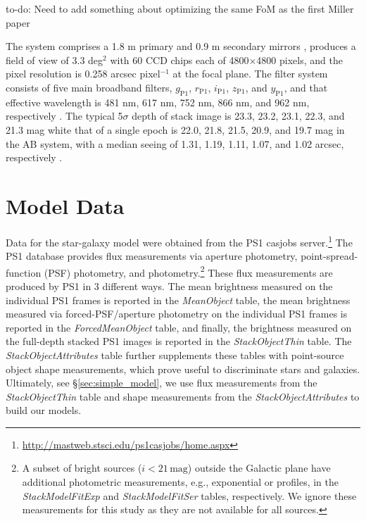 \documentclass[twocolumn, dvipdfmx]{aastex62}
\newcommand{\todo}[1]{{\color{magenta} to-do: {#1}}}
\begin{document}
\todo{Need to add something about optimizing the same FoM as the first Miller paper}

The system comprises a 1.8 m primary and 0.9 m secondary mirrors \citep{Hodapp04}, 
produces a field of view of 3.3 deg$^2$ with 60 CCD chips each of 4800$\times$4800 pixels, 
and the pixel resolution is 0.258 arcsec pixel$^{-1}$ at the focal plane. 
The filter system consists of five main broadband filters, 
$g_{\mathrm{P1}}$, $r_{\mathrm{P1}}$, $i_{\mathrm{P1}}$, $z_{\mathrm{P1}}$, and $y_{\mathrm{P1}}$, 
and that effective wavelength is 481 nm, 617 nm, 752 nm, 866 nm, and 962 nm, 
respectively \citep{Tonry12, Schlafly12}. 
The typical 5$\sigma$ depth of stack image is 23.3, 23.2, 23.1, 22.3, and 21.3 mag 
white that of a single epoch is 22.0, 21.8, 21.5, 20.9, and 19.7 mag in the AB system, 
with a median seeing of 1.31, 1.19, 1.11, 1.07, and 1.02 arcsec, respectively \citep{Chambers16}. 
\fi


\section{Model Data}\label{sec:model_data}

Data for the star-galaxy model were obtained from the PS1 casjobs
server.\footnote{\url{http://mastweb.stsci.edu/ps1casjobs/home.aspx}} The PS1
database provides flux measurements via aperture photometry,
point-spread-function (PSF) photometry, and \citet{Kron80}
photometry.\footnote{A subset of bright sources ($i < 21\,\mathrm{mag}$)
outside the Galactic plane have additional photometric measurements, e.g.,
exponential or \citet{Sersic63} profiles, in the \textit{StackModelFitExp} and
\textit{StackModelFitSer} tables, respectively. We ignore these measurements
for this study as they are not available for all sources.} These flux
measurements are produced by PS1 in 3 different ways. The mean brightness
measured on the individual PS1 frames is reported in the \textit{MeanObject}
table, the mean brightness measured via forced-PSF/aperture photometry on the
individual PS1 frames is reported in the \textit{ForcedMeanObject} table, and
finally, the brightness measured on the full-depth stacked PS1 images is
reported in the \textit{StackObjectThin} table. The
\textit{StackObjectAttributes} table further supplements these tables with
point-source object shape measurements, which prove useful to discriminate
stars and galaxies. Ultimately, see \S\ref{sec:simple_model}, we use flux
measurements from the \textit{StackObjectThin} table and shape measurements
from the \textit{StackObjectAttributes} to build our models.
\end{document}
